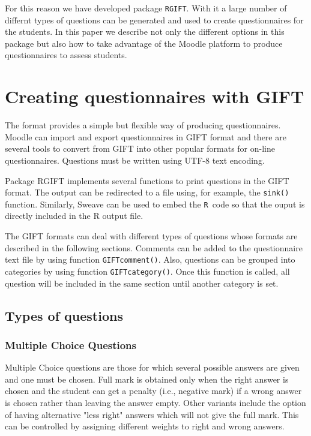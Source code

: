 \documentclass[a4paper]{article}
\newcommand{\RR}{\texttt{R}\ }
\newcommand{\code}[1]{\texttt{#1}}
\newcommand{\pkg}[1]{\textsf{#1}}
\begin{document}
For this reason we have developed package \code{RGIFT}. With it a large
number of differnt types of questions can be generated and used to create
questionnaires for the students. In this paper we describe not only 
the different options in this package but also how to take advantage of
the Moodle platform to produce questionnaires to assess students.

\section{Creating questionnaires with GIFT}

The \citet{GIFT} format provides a simple but flexible way of producing
questionnaires. Moodle can import and export questionnaires in GIFT format and
there are several tools to convert from GIFT into other popular formats for
on-line questionnaires. Questions must be written using UTF-8 text encoding.

Package \pkg{RGIFT} implements several functions to print questions in the GIFT
format. The output can be redirected to a file using, for example, the
\code{sink()} function. Similarly, \pkg{Sweave} \citep{Leisch:2002} can be used
to embed the \RR code so that the ouput is directly included in the R output
file.

The GIFT formats can deal with different types of questions whose formats are
described in the following sections.  Comments can be added to the
questionnaire text file by using function \code{GIFTcomment()}. Also, questions
can be grouped into categories by using function \code{GIFTcategory()}. Once
this function is called, all question will be included in the same section
until another category is set.


\subsection{Types of questions}

\subsubsection{Multiple Choice Questions}

Multiple Choice questions are those for which several possible answers are
given and one must be chosen. Full mark is obtained only when the right answer
is chosen and the student can get a penalty (i.e., negative mark) if a wrong
answer is chosen rather than leaving the answer empty.  Other variants include
the option of having alternative "less right" answers which will not give the
full mark. This can be controlled by assigning different weights to right and
wrong answers.
\end{document}
